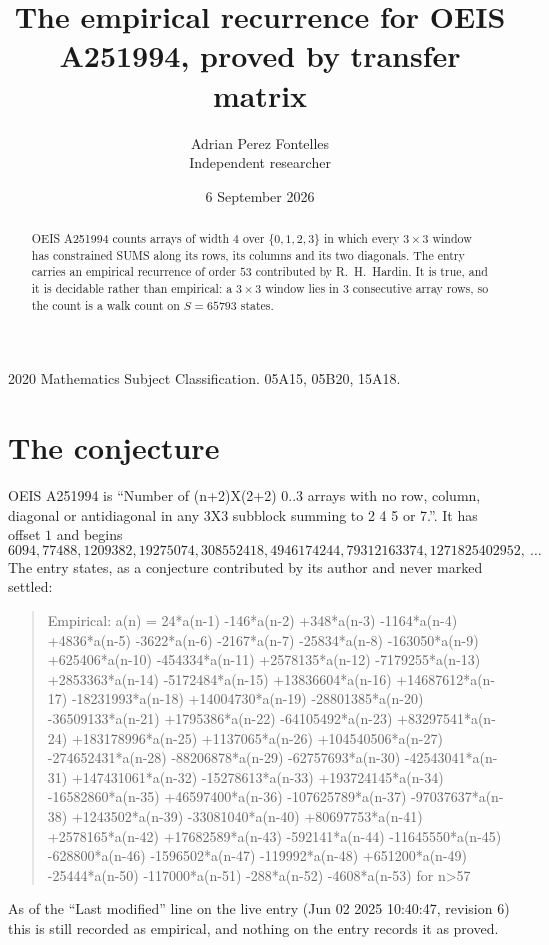 \documentclass[11pt,a4paper]{article}
\title{The empirical recurrence for OEIS A251994, proved by transfer matrix}
\author{Adrian Perez Fontelles\\ \small Independent researcher}
\date{6 September 2026}
\theoremstyle{plain}
\theoremstyle{definition}
\begin{document}
\maketitle

\begin{abstract}
OEIS A251994 counts arrays of width $4$ over $\{0,1,2,3\}$ in which every $3\times3$ window has
constrained SUMS along its rows, its columns and its two diagonals. The entry carries an
empirical recurrence of order $53$ contributed by R.~H.~Hardin. It is true, and it is
decidable rather than empirical: a $3\times3$ window lies in $3$ consecutive array rows,
so the count is a walk count on $S=65793$ states.
\end{abstract}

\noindent\small 2020 Mathematics Subject Classification. 05A15, 05B20, 15A18.\normalsize

\section{The conjecture}

OEIS A251994 is ``Number of (n+2)X(2+2) 0..3 arrays with no row, column, diagonal or antidiagonal in any 3X3 subblock summing to 2 4 5 or 7.''. It has offset $1$ and begins
\[
6094, 77488, 1209382, 19275074, 308552418, 4946174244, 79312163374, 1271825402952,\ \dots
\]
The entry states, as a conjecture contributed by its author and never marked settled:
\begin{quote}
Empirical: a(n) = 24*a(n-1) -146*a(n-2) +348*a(n-3) -1164*a(n-4) +4836*a(n-5) -3622*a(n-6) -2167*a(n-7) -25834*a(n-8) -163050*a(n-9) +625406*a(n-10) -454334*a(n-11) +2578135*a(n-12) -7179255*a(n-13) +2853363*a(n-14) -5172484*a(n-15) +13836604*a(n-16) +14687612*a(n-17) -18231993*a(n-18) +14004730*a(n-19) -28801385*a(n-20) -36509133*a(n-21) +1795386*a(n-22) -64105492*a(n-23) +83297541*a(n-24) +183178996*a(n-25) +1137065*a(n-26) +104540506*a(n-27) -274652431*a(n-28) -88206878*a(n-29) -62757693*a(n-30) -42543041*a(n-31) +147431061*a(n-32) -15278613*a(n-33) +193724145*a(n-34) -16582860*a(n-35) +46597400*a(n-36) -107625789*a(n-37) -97037637*a(n-38) +1243502*a(n-39) -33081040*a(n-40) +80697753*a(n-41) +2578165*a(n-42) +17682589*a(n-43) -592141*a(n-44) -11645550*a(n-45) -628800*a(n-46) -1596502*a(n-47) -119992*a(n-48) +651200*a(n-49) -25444*a(n-50) -117000*a(n-51) -288*a(n-52) -4608*a(n-53) for n>57
\end{quote}
As of the ``Last modified'' line on the live entry (Jun 02 2025 10:40:47, revision 6) this is still
recorded as empirical, and nothing on the entry records it as proved.
\end{document}
